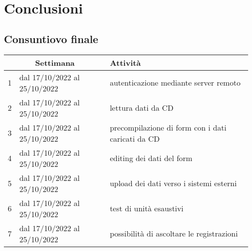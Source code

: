 
\chapter{Conclusioni}
\label{cap:conclusioni}
\section{Consuntiovo finale}
\label{sec:consuntivo-finale}

\begin{center}
  \renewcommand{\arraystretch}{1.8} %
  \begin{tabular}{ |p{1cm}|p{}|p{}| }
    \hline
    \multicolumn{2}{|c|}{\textbf{Settimana}} & \textbf{Attività}                                                                                                  \\
    \hline
    1                                        & dal 17/10/2022 al 25/10/2022 & autenticazione mediante server remoto                                               \\
    \hline
    2                                        & dal 17/10/2022 al 25/10/2022 & lettura dati da CD                                                                  \\
    \hline
    3                                        & dal 17/10/2022 al 25/10/2022 & precompilazione di form con i dati caricati da CD                                   \\
    \hline
    4                                        & dal 17/10/2022 al 25/10/2022 & editing dei dati del form                                                           \\
    \hline
    5                                        & dal 17/10/2022 al 25/10/2022 & upload dei dati verso i sistemi esterni                                             \\
    \hline
    6                                        & dal 17/10/2022 al 25/10/2022 & test di unità esaustivi                                                             \\
    \hline
    7                                        & dal 17/10/2022 al 25/10/2022 & possibilità di ascoltare le registrazioni                                           \\

\end{tabular}
\end{center}
